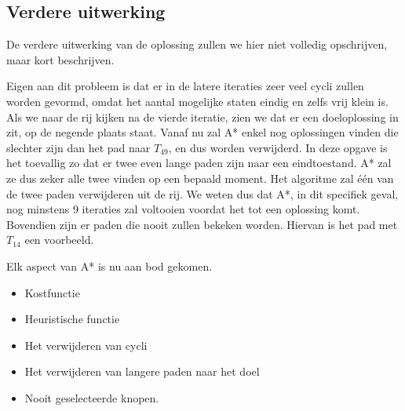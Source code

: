 \documentclass[alternative-exam.tex]{subfiles}
\begin{document}
\subsection{Verdere uitwerking}
De verdere uitwerking van de oplossing zullen we hier niet volledig opschrijven, maar kort beschrijven.

Eigen aan dit probleem is dat er in de latere iteraties zeer veel cycli zullen worden gevormd, omdat het aantal mogelijke staten eindig en zelfs vrij klein is.
Als we naar de rij kijken na de vierde iteratie, zien we dat er een doeloplossing in zit, op de negende plaats staat. Vanaf nu zal A* enkel nog oplossingen vinden die slechter zijn dan het pad naar $T_{49}$, en dus worden verwijderd. In deze opgave is het toevallig zo dat er twee even lange paden zijn naar een eindtoestand. A* zal ze dus zeker alle twee vinden op een bepaald moment. Het algoritme zal \'e\'en van de twee paden verwijderen uit de rij. We weten dus dat A*, in dit specifiek geval, nog minstens 9 iteraties zal voltooien voordat het tot een oplossing komt. Bovendien zijn er paden die nooit zullen bekeken worden. Hiervan is het pad met $T_{14}$ een voorbeeld.

Elk aspect van A* is nu aan bod gekomen.
\begin{itemize}
\item Kostfunctie
\item Heuristische functie
\item Het verwijderen van cycli
\item Het verwijderen van langere paden naar het doel
\item Nooit geselecteerde knopen.
\end{itemize}
\end{document}

